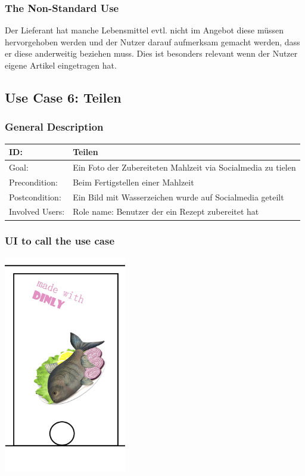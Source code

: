 \documentclass[12pt]{article}
\theoremstyle{definition}
\begin{document}
\subsubsection{The Non-Standard Use}
Der Lieferant hat manche Lebensmittel evtl. nicht im Angebot diese müssen hervorgehoben werden und der Nutzer darauf aufmerksam gemacht werden, dass er diese anderweitig beziehen muss. Dies ist besonders relevant wenn der Nutzer eigene Artikel eingetragen hat.
\pagebreak

\subsection{Use Case 6: Teilen}

\subsubsection{General Description}

\begin{tabular}{|p{.2\linewidth}|p{.65\linewidth}|}
\hline 
ID: & Teilen \\ \hline
Goal: & Ein Foto der Zubereiteten Mahlzeit via Socialmedia zu tielen \\ \hline
Precondition: & Beim Fertigstellen einer Mahlzeit \\ \hline
Postcondition: & Ein Bild mit Wasserzeichen wurde auf Socialmedia geteilt\\ \hline
Involved Users: &Role name: Benutzer der ein Rezept zubereitet hat \\ \hline
\end{tabular}

\subsubsection{UI to call the use case}
\begin{center}
    \includegraphics[width=0.4\textwidth]{res/images/Share.png}
\end{center}
\end{document}
